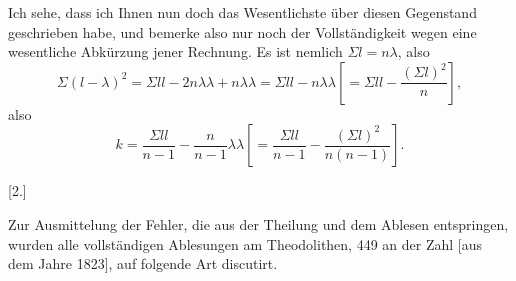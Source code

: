 \par\noindent\hspace*{\parindent}Ich sehe, dass ich Ihnen nun doch das Wesentlichste über diesen Gegenstand geschrieben habe, und bemerke also nur noch der Vollständigkeit wegen eine wesentliche Abkürzung jener Rechnung. Es ist nemlich $\Sigma l=n\lambda$, also
\[
\Sigma(l-\lambda)^2=\Sigma ll-2n\lambda\lambda+n\lambda\lambda=\Sigma ll-n\lambda\lambda
\left[=\Sigma ll-\frac{(\Sigma l)^2}{n}\right],
\]
\noindent also
\[
k=\frac{\Sigma ll}{n-1}-\frac{n}{n-1}\lambda\lambda
\left[=\frac{\Sigma ll}{n-1}-\frac{(\Sigma l)^2}{n(n-1)}\right].
\]
\par\bigskip\bigskip
\begin{center}{\large [2.]}\end{center}
\par\noindent\hspace*{\parindent}Zur Ausmittelung der Fehler, die aus der Theilung und dem Ablesen entspringen, wurden alle vollständigen Ablesungen am Theodolithen, 449 an der Zahl [aus dem Jahre 1823], auf folgende Art discutirt.

